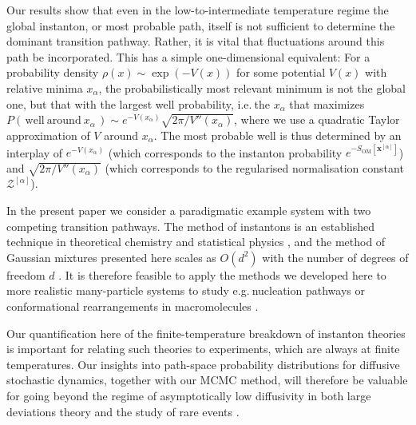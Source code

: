 Our results show that even in the low-to-intermediate temperature
regime the global instanton, or most probable path, itself is not
sufficient to determine the dominant transition pathway. Rather, it
is vital that fluctuations around this path be incorporated. This
has a simple one-dimensional equivalent: For a probability density
$\rho(x)\sim\exp(-V(x))$ for some potential $V(x)$ with relative
minima $x_{\alpha}$, the probabilistically most relevant minimum
is not the global one, but that with the largest well probability,
i.e.$~$the $x_{\alpha}$ that maximizes $P(\,\mathrm{well~around~}x_{\alpha}\,)\sim e^{-V(x_{\alpha})}\sqrt{{2\pi}/{V''(x_{\alpha})}}$,
where we use a quadratic Taylor approximation of $V$ around $x_{\alpha}$.
The most probable well is thus determined by an interplay of $e^{-V(x_{\alpha})}$
(which corresponds to the instanton probability $e^{-S_{\text{OM}}[\mathbf{x}^{[\alpha]}]}$)
and $\sqrt{{2\pi}/{V''(x_{\alpha})}}$ (which corresponds to the regularised
normalisation constant $\mathcal{Z}^{[\alpha]}$).

In the present paper we consider a paradigmatic example system with
two competing transition pathways. The method of instantons is an
established technique in theoretical chemistry and statistical physics
\citep{eMinimumActionMethod2004,e_string_2002,grafke_instanton_2015,grafke_numerical_2019,schorleppGelFandYaglomType2021,dematteis_experimental_2019,ferreApproximateOptimalControls2021,kikuchiRitzMethodTransition2020,heymannGeometricMinimumAction2008},
and the method of Gaussian mixtures presented here scales as $O(d^{2})$
with the number of degrees of freedom $d$ \citep{note:SI}. It is
therefore feasible to apply the methods we developed here to more
realistic many-particle systems to study e.g.$~$nucleation pathways
\citep{e_string_2002,lutskoHowCrystalsForm2019,rein_ten_wolde_numerical_1996}
or conformational rearrangements in macromolecules \citep{ren_transition_2005,fujisakiOnsagerMachlupActionbased2010,fujisakiMultiscaleEnhancedPath2013,gartner_modeling_2019}.

Our quantification here of the finite-temperature breakdown of instanton
theories is important for relating such theories to experiments, which
are always at finite temperatures. Our insights into path-space probability
distributions for diffusive stochastic dynamics, together with our
MCMC method, will therefore be valuable for going beyond the regime
of asymptotically low diffusivity in both large deviations theory
\citep{ventselSMALLRANDOMPERTURBATIONS1970,vanden-eijndenGeometricMinimumAction2008,eMinimumActionMethod2004,gartnerModelingSimulationsPolymers2019}
and the study of rare events \citep{grafkeSharpAsymptoticEstimates2021}.
